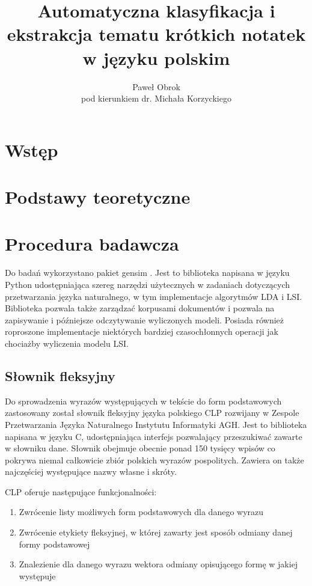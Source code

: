 \documentclass[11pt,a4paper]{article}
\begin{document}
\title{Automatyczna klasyfikacja i ekstrakcja tematu krótkich notatek w języku polskim}
\author{Paweł Obrok\\pod kierunkiem dr. Michała Korzyckiego}

\maketitle
\pagebreak

\tableofcontents
\pagebreak

\section{Wstęp}
\section{Podstawy teoretyczne}
\section{Procedura badawcza}

Do badań wykorzystano pakiet gensim \cite{gensim}. Jest to biblioteka napisana
w języku Python udostępniająca szereg narzędzi użytecznych w zadaniach
dotyczących przetwarzania języka naturalnego, w tym implementacje algorytmów
LDA i LSI. Biblioteka pozwala także zarządzać korpusami dokumentów i pozwala na
zapisywanie i późniejsze odczytywanie wyliczonych modeli. Posiada również
roproszone implementacje niektórych bardziej czasochłonnych operacji jak
chociażby wyliczenia modelu LSI.

\subsection{Słownik fleksyjny}

Do sprowadzenia wyrazów występujących w tekście do form podstawowych
zastosowany został słownik fleksyjny języka polskiego CLP
\cite{gajecki-slownik} rozwijany w Zespole Przetwarzania Języka Naturalnego
Instytutu Informatyki AGH. Jest to biblioteka napisana w języku C,
udostępniająca interfejs pozwalający przeszukiwać zawarte w słowniku dane.
Słownik obejmuje obecnie ponad 150 tysięcy wpisów co pokrywa niemal całkowicie
zbiór polskich wyrazów pospolitych. Zawiera on także najczęściej występujące
nazwy własne i skróty.

CLP oferuje następujące funkcjonalności:
\begin{enumerate}
\item Zwrócenie listy możliwych form podstawowych dla danego wyrazu
\item Zwrócenie etykiety fleksyjnej, w której zawarty jest sposób odmiany
danej formy podstawowej
\item Znalezienie dla danego wyrazu wektora odmiany opisującego formę
w jakiej występuje
\end{enumerate}
\end{document}
